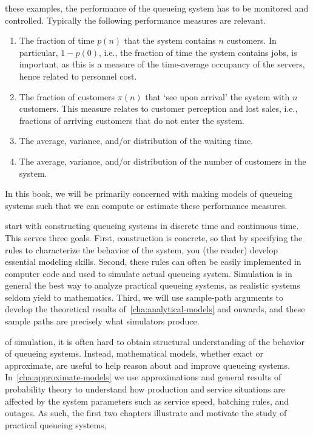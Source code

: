 \documentclass[queueing-book]{subfiles}
\begin{document}
 these examples, the performance of the queueing system has to be monitored and controlled.
Typically the following performance measures are relevant.
\begin{enumerate}
\item The fraction of time $p(n)$ that the system contains $n$ customers.
 In particular, $1-p(0)$, i.e., the fraction of time the system contains jobs, is important, as this is a measure of the time-average occupancy of the servers, hence related to personnel cost.
\item The fraction of customers $\pi(n)$ that `see upon arrival' the system with $n$ customers.
  This measure relates to customer perception and lost sales, i.e., fractions of arriving customers that do not enter the system.
\item The average, variance, and/or distribution of the waiting time.
\item The average, variance, and/or distribution of the number of customers in the system.\
\end{enumerate}
In this book, we will be primarily concerned with making models of queueing systems such that we can compute or estimate these performance measures.

 start with constructing queueing systems in discrete time and continuous time.
This serves three goals.
First, construction is concrete, so that by specifying the rules to characterize the behavior of the system, you (the reader) develop essential modeling skills.
Second, these rules can often be easily implemented in computer code and used to simulate actual queueing system.
Simulation is in general the best way to analyze practical queueing systems, as realistic systems seldom yield to mathematics.
Third, we will use sample-path arguments to develop the theoretical results of~\cref{cha:analytical-models} and onwards, and these sample paths are precisely what simulators produce.

 of simulation, it is often hard to obtain structural understanding of the behavior of queueing systems.
Instead, mathematical models, whether exact or approximate, are useful to help reason about and improve queueing systems.
In~\cref{cha:approximate-models} we use approximations and general results of probability theory to understand how production and service situations are affected by the system parameters such as service speed, batching rules, and outages.
As such, the first two chapters illustrate and motivate the study of practical queueing systems,
\end{document}
